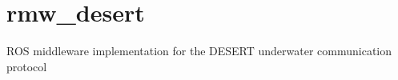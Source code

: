 \chapter{rmw\+\_\+desert}
\hypertarget{md_README}{}\label{md_README}
\label{md_README_autotoc_md0}%
%
ROS middleware implementation for the DESERT underwater communication protocol 